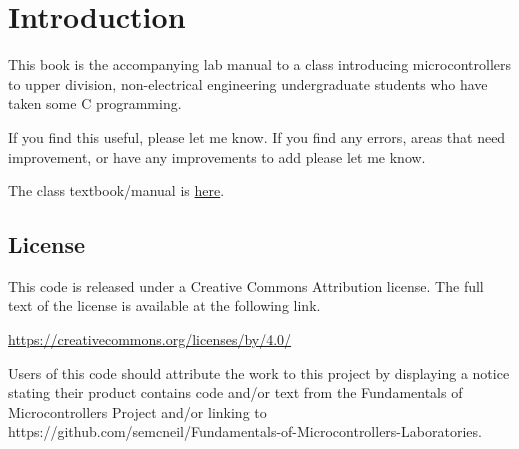 \chapter{Introduction}

This book is the accompanying lab manual to a class introducing microcontrollers
to upper division, non-electrical engineering undergraduate students who 
have taken some C programming.

If you find this useful, please let me know. If you find any errors, areas
that need improvement, or have any improvements to add please let me know.

The class textbook/manual is 
\href{https://github.com/semcneil/Fundamentals-of-Microcontrollers-Laboratories}{here}.

\section{License}
This code is released under a Creative Commons Attribution license.
The full text of the license is available at the following link.

\href{https://creativecommons.org/licenses/by/4.0/}{https://creativecommons.org/licenses/by/4.0/}

Users of this code should attribute the work to this
project by displaying a notice stating their product contains code
and/or text from the Fundamentals of Microcontrollers Project and/or linking to\\
https://github.com/semcneil/Fundamentals-of-Microcontrollers-Laboratories.